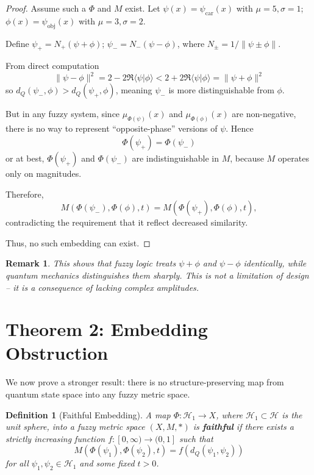 \documentclass{article}
\newtheorem{definition}[theorem]{Definition}
\newtheorem{remark}[theorem]{Remark}
\begin{document}
\begin{proof}
Assume such a $\Phi$ and $M$ exist. Let
$\psi(x) = \psi_{\text{car}}(x)$ with $\mu=5, \sigma=1$;
$\phi(x) = \psi_{\text{obj}}(x)$ with $\mu=3, \sigma=2$.

Define  $\psi_+ = N_+ (\psi + \phi)$;
$\psi_- = N_- (\psi - \phi)$, where $N_\pm = 1/\|\psi \pm \phi\|$.

From direct computation
$$
\|\psi - \phi\|^2 = 2 - 2\Re\langle\psi|\phi\rangle < 2 + 2\Re\langle\psi|\phi\rangle = \|\psi + \phi\|^2
$$
so $d_Q(\psi_-,\phi) > d_Q(\psi_+,\phi)$, meaning $\psi_-$ is more distinguishable from $\phi$.

But in any fuzzy system, since $\mu_{\Phi(\psi)}(x)$ and $\mu_{\Phi(\phi)}(x)$ are non-negative, there is no way to represent “opposite-phase” versions of $\psi$. Hence
$$
\Phi(\psi_+) = \Phi(\psi_-)
$$
or at best, $\Phi(\psi_+)$ and $\Phi(\psi_-)$ are indistinguishable in $M$, because $M$ operates only on magnitudes.

Therefore,
$$
M(\Phi(\psi_-), \Phi(\phi), t) = M(\Phi(\psi_+), \Phi(\phi), t),
$$
contradicting the requirement that it reflect decreased similarity.

Thus, no such embedding can exist.
\end{proof}

\begin{remark}
This shows that fuzzy logic treats $\psi + \phi$ and $\psi - \phi$ identically, while quantum mechanics distinguishes them sharply. This is not a limitation of design -- it is a consequence of lacking complex amplitudes.
\end{remark}

\section{Theorem 2: Embedding Obstruction}

We now prove a stronger result: there is no structure-preserving map from quantum state space into any fuzzy metric space.

\begin{definition}[Faithful Embedding]
A map $\Phi: \mathcal{H}_1 \to X$, where $\mathcal{H}_1 \subset \mathcal{H}$ is the unit sphere, into a fuzzy metric space $(X,M,*)$ is \textbf{faithful} if there exists a strictly increasing function $f: [0,\infty) \to (0,1]$ such that
$$
M(\Phi(\psi_1), \Phi(\psi_2), t) = f(d_Q(\psi_1,\psi_2))
$$
for all $\psi_1,\psi_2 \in \mathcal{H}_1$ and some fixed $t > 0$.
\end{definition}
\end{document}
